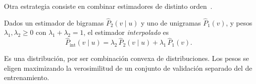 Otra estrategia consiste en combinar estimadores de distinto orden~\cite[§3.6.3]{jm3}.

\begin{definicion}
Dados un estimador de bigramas $\widehat{P}_2(v\mid u)$ y uno de unigramas $\widehat{P}_1(v)$, y pesos $\lambda_1,\lambda_2\ge 0$ con $\lambda_1+\lambda_2=1$, el estimador \emph{interpolado} es
\[
\widehat{P}_{\mathrm{int}}(v\mid u)=\lambda_2\,\widehat{P}_2(v\mid u)+\lambda_1\,\widehat{P}_1(v).
\]
\end{definicion}

Es una distribución, por ser combinación convexa de distribuciones. Los pesos se eligen maximizando la verosimilitud de un conjunto de validación separado del de entrenamiento.

